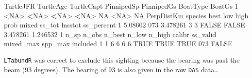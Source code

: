 \documentclass[
]{book}
\newenvironment{Shaded}{\begin{snugshade}}{\end{snugshade}}
\newcommand{\ConstantTok}[1]{\textcolor[rgb]{0.00,0.00,0.00}{#1}}
\newcommand{\DecValTok}[1]{\textcolor[rgb]{0.00,0.00,0.81}{#1}}
\newcommand{\ErrorTok}[1]{\textcolor[rgb]{0.64,0.00,0.00}{\textbf{#1}}}
\newcommand{\FloatTok}[1]{\textcolor[rgb]{0.00,0.00,0.81}{#1}}
\newcommand{\FunctionTok}[1]{\textcolor[rgb]{0.00,0.00,0.00}{#1}}
\newcommand{\NormalTok}[1]{#1}
\newcommand{\OtherTok}[1]{\textcolor[rgb]{0.56,0.35,0.01}{#1}}
\newcommand{\SpecialCharTok}[1]{\textcolor[rgb]{0.00,0.00,0.00}{#1}}
\newcommand{\StringTok}[1]{\textcolor[rgb]{0.31,0.60,0.02}{#1}}
\begin{document}
\begin{Shaded}
\begin{Highlighting}[]
\NormalTok{  TurtleJFR TurtleAge TurtleCapt PinnipedSp PinnipedGs BoatType BoatGs}
\DecValTok{1}      \SpecialCharTok{\textless{}}\ConstantTok{NA}\SpecialCharTok{\textgreater{}}      \ErrorTok{\textless{}}\ConstantTok{NA}\SpecialCharTok{\textgreater{}}       \ErrorTok{\textless{}}\ConstantTok{NA}\SpecialCharTok{\textgreater{}}       \ErrorTok{\textless{}}\ConstantTok{NA}\SpecialCharTok{\textgreater{}}         \ConstantTok{NA}     \SpecialCharTok{\textless{}}\ConstantTok{NA}\SpecialCharTok{\textgreater{}}     \ConstantTok{NA}
\NormalTok{  PerpDistKm species     best low high  prob mixed   ss\_tot  lnsstot ss\_percent}
\DecValTok{1}    \FloatTok{5.08602}     \DecValTok{073} \FloatTok{3.478261}   \DecValTok{3}    \DecValTok{3} \ConstantTok{FALSE} \ConstantTok{FALSE} \FloatTok{3.478261} \FloatTok{1.246532}          \DecValTok{1}
\NormalTok{  n\_sp n\_obs n\_best n\_low n\_high calibr ss\_valid mixed\_max spp\_max included}
\DecValTok{1}    \DecValTok{1}     \DecValTok{6}      \DecValTok{6}     \DecValTok{6}      \DecValTok{6}   \ConstantTok{TRUE}     \ConstantTok{TRUE}      \ConstantTok{TRUE}     \DecValTok{073}    \ConstantTok{FALSE}
\end{Highlighting}
\end{Shaded}

\texttt{LTabundR} was correct to exclude this sighting because the bearing was past the beam (93 degrees). The bearing of 93 is also given in the raw \texttt{DAS} data\ldots{}

\begin{Shaded}
\end{Shaded}
\end{document}
